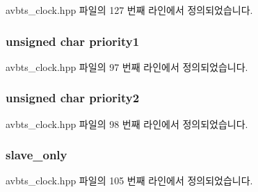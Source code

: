 avbts\+\_\+clock.\+hpp 파일의 127 번째 라인에서 정의되었습니다.

\subsubsection[{\texorpdfstring{priority1}{priority1}}]{\setlength{\rightskip}{0pt plus 5cm}unsigned char priority1\hspace{0.3cm}{\ttfamily [private]}}\hypertarget{class_i_e_e_e1588_clock_aaaa084057ac150d5cfeaff1ccee422b8}{}\label{class_i_e_e_e1588_clock_aaaa084057ac150d5cfeaff1ccee422b8}


avbts\+\_\+clock.\+hpp 파일의 97 번째 라인에서 정의되었습니다.

\subsubsection[{\texorpdfstring{priority2}{priority2}}]{\setlength{\rightskip}{0pt plus 5cm}unsigned char priority2\hspace{0.3cm}{\ttfamily [private]}}\hypertarget{class_i_e_e_e1588_clock_a726134dcd45a308e0e84419c09793ed3}{}\label{class_i_e_e_e1588_clock_a726134dcd45a308e0e84419c09793ed3}


avbts\+\_\+clock.\+hpp 파일의 98 번째 라인에서 정의되었습니다.

\subsubsection[{\texorpdfstring{slave\+\_\+only}{slave_only}}]{ slave\+\_\+only\hspace{0.3cm}{\ttfamily [private]}}\hypertarget{class_i_e_e_e1588_clock_a01957b2e8226d4eeef1bae5277cc51f4}{}\label{class_i_e_e_e1588_clock_a01957b2e8226d4eeef1bae5277cc51f4}


avbts\+\_\+clock.\+hpp 파일의 105 번째 라인에서 정의되었습니다.

